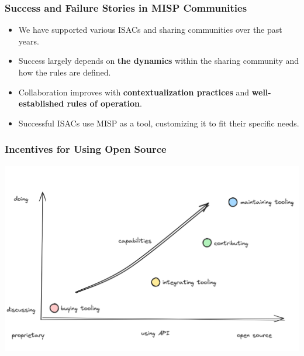 \begin{frame}
    \frametitle{Success and Failure Stories in MISP Communities}
    \begin{itemize}
        \item We have supported various ISACs and sharing communities over the past years.
	\item Success largely depends on {\bf the dynamics} within the sharing community and how the rules are defined.
	\item Collaboration improves with {\bf contextualization practices} and {\bf well-established rules of operation}.
        \item Successful ISACs use MISP as a tool, customizing it to fit their specific needs.
    \end{itemize}
\end{frame}

\begin{frame}
    \frametitle{Incentives for Using Open Source}
    \begin{center}
        \includegraphics[width=0.8\linewidth]{opensource-csirt.png}
    \end{center}
\end{frame}

